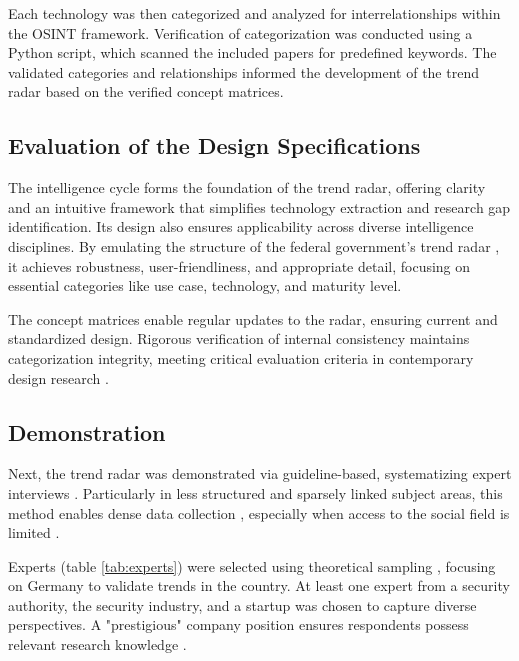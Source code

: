 \documentclass[10pt]{article}
\begin{document}
Each technology was then categorized and analyzed for interrelationships within the OSINT framework. Verification of categorization was conducted using a Python script, which scanned the included papers for predefined keywords. The validated categories and relationships informed the development of the trend radar based on the verified concept matrices.


\subsection{Evaluation of the Design Specifications}
The intelligence cycle forms the foundation of the trend radar, offering clarity and an intuitive framework that simplifies technology extraction and research gap identification. Its design also ensures applicability across diverse intelligence disciplines. By emulating the structure of the federal government's trend radar \cite{Stich.2022}, it achieves robustness, user-friendliness, and appropriate detail, focusing on essential categories like use case, technology, and maturity level.

The concept matrices enable regular updates to the radar, ensuring current and standardized design. Rigorous verification of internal consistency maintains categorization integrity, meeting critical evaluation criteria in contemporary design research \cite{vomBrocke.2020b}.


\subsection{Demonstration}
Next, the trend radar was demonstrated via guideline-based, systematizing expert interviews \cite{Bogner.2014, Glaser.2009, Meuser.1991}. Particularly in less structured and sparsely linked subject areas, this method enables dense data collection \cite{Bogner.2014, Meuser.1991}, especially when access to the social field is limited \cite{Bogner.2002c, Glaser.2009}.

Experts (table \ref{tab:experts}) were selected using theoretical sampling \cite{Glaser.1967}, focusing on Germany to validate trends in the country. At least one expert from a security authority, the security industry, and a startup was chosen to capture diverse perspectives. A "prestigious" company position ensures respondents possess relevant research knowledge \cite{Bogner.2002b}.
\end{document}
